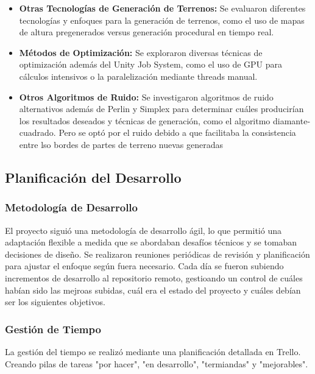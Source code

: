 \begin{itemize}
    \item \textbf{Otras Tecnologías de Generación de Terrenos:} Se evaluaron diferentes tecnologías y enfoques para la generación de terrenos, como el uso de mapas de altura pregenerados versus generación procedural en tiempo real.
    
    \item \textbf{Métodos de Optimización:} Se exploraron diversas técnicas de optimización además del Unity Job System, como el uso de GPU para cálculos intensivos o la paralelización mediante threads manual.
    
    \item \textbf{Otros Algoritmos de Ruido:} Se investigaron algoritmos de ruido alternativos además de Perlin y Simplex para determinar cuáles producirían los resultados deseados y técnicas de generación, como el algoritmo diamante-cuadrado. Pero se optó por el ruido debido a que facilitaba la consistencia entre lso bordes de partes de terreno nuevas generadas
\end{itemize}

\subsection{Planificación del Desarrollo}

\subsubsection{Metodología de Desarrollo}
El proyecto siguió una metodología de desarrollo ágil, lo que permitió una adaptación flexible a medida que se abordaban desafíos técnicos y se tomaban decisiones de diseño. Se realizaron reuniones periódicas de revisión y planificación para ajustar el enfoque según fuera necesario. Cada día se fueron subiendo incrementos de desarrollo al repositorio remoto, gestioando un control de cuáles habían sido las mejroas subidas, cuál era el estado del proyecto y cuáles debían ser los siguientes objetivos.

\subsubsection{Gestión de Tiempo}
La gestión del tiempo se realizó mediante una planificación detallada en Trello. Creando pilas de tareas "por hacer", "en desarrollo", "termiandas" y "mejorables".

